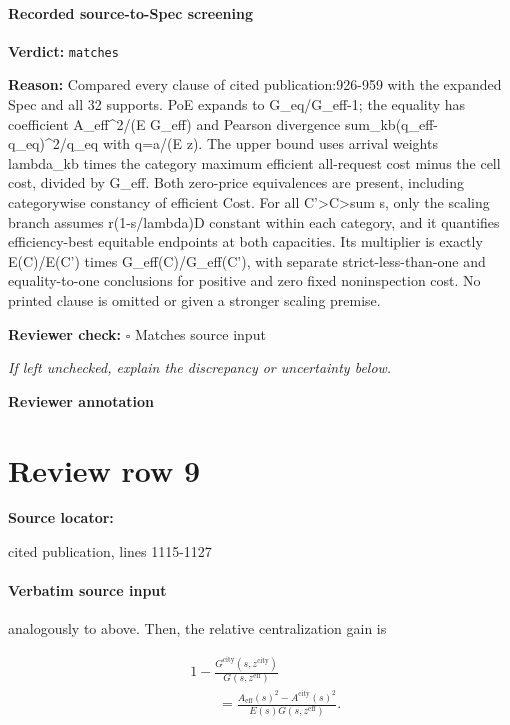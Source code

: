 \documentclass[10pt]{article}
\newcommand{\reviewerbox}{%
  \par\noindent\fbox{\parbox{0.96\linewidth}{\rule{0pt}{0.38in}}}\par
}
\newcommand{\reviewmatch}[1]{%
  \par\noindent\textbf{Reviewer check:} $\square$\; #1\par
  \noindent\emph{If left unchecked, explain the discrepancy or uncertainty below.}\par
}
\begin{document}
\paragraph{Recorded source-to-Spec screening}
\textbf{Verdict:} \texttt{matches}
\\
{\raggedright
\textbf{Reason:} Compared every clause of cited publication:\allowbreak{}926-\allowbreak{}959 with the expanded Spec and all 32 supports.\allowbreak{} PoE expands to G\_\allowbreak{}eq/\allowbreak{}G\_\allowbreak{}eff-\allowbreak{}1;\allowbreak{} the equality has coefficient A\_\allowbreak{}eff\textasciicircum{}2/\allowbreak{}(E G\_\allowbreak{}eff) and Pearson divergence sum\_\allowbreak{}kb(q\_\allowbreak{}eff-\allowbreak{}q\_\allowbreak{}eq)\textasciicircum{}2/\allowbreak{}q\_\allowbreak{}eq with q=a/\allowbreak{}(E z).\allowbreak{} The upper bound uses arrival weights lambda\_\allowbreak{}kb times the category maximum efficient all-\allowbreak{}request cost minus the cell cost, divided by G\_\allowbreak{}eff.\allowbreak{} Both zero-\allowbreak{}price equivalences are present, including categorywise constancy of efficient Cost.\allowbreak{} For all C'>C>sum s, only the scaling branch assumes r(1-\allowbreak{}s/\allowbreak{}lambda)D constant within each category, and it quantifies efficiency-\allowbreak{}best equitable endpoints at both capacities.\allowbreak{} Its multiplier is exactly E(C)/\allowbreak{}E(C') times G\_\allowbreak{}eff(C)/\allowbreak{}G\_\allowbreak{}eff(C'), with separate strict-\allowbreak{}less-\allowbreak{}than-\allowbreak{}one and equality-\allowbreak{}to-\allowbreak{}one conclusions for positive and zero fixed noninspection cost.\allowbreak{} No printed clause is omitted or given a stronger scaling premise.\allowbreak{}
\par}
\reviewmatch{Matches source input}
\noindent\textbf{Reviewer annotation}\par
\reviewerbox
\clearpage
\hypertarget{source-claim-ed40e9a61e8b75e9}{}
\section*{Review row 9}
\textbf{Source locator:} {\footnotesize\raggedright cited publication, lines 1115-\allowbreak{}1127\par}
\paragraph{Verbatim source input}
\begin{ReviewVerbatim}
analogously to above. Then, the relative centralization gain is




\begin{equation}
\begin{aligned}
  &1-\frac{G^{\mathrm{city}}(s,z^{\mathrm{city}})}{G(s,z^{\mathrm{eff}})}\\[-2pt]
  &\qquad=\frac{A_{\mathrm{eff}}(s)^2-A^{\mathrm{city}}(s)^2}
  {E(s)G(s,z^{\mathrm{eff}})}.
\end{aligned}
  \label{eq:aligned-pooling-gain}
\end{equation}
\end{ReviewVerbatim}
\end{document}
